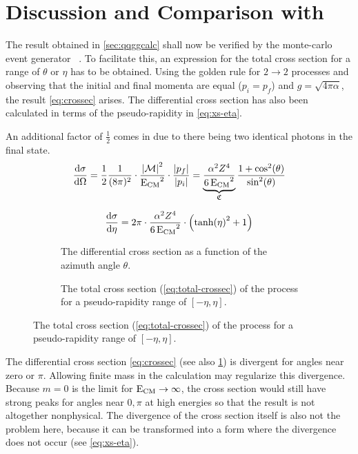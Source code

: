 \section{Discussion and Comparison with \sherpa}%
\label{sec:compsher}

The result obtained in \cref{sec:qqggcalc} shall now be verified by the
monte-carlo event generator \sherpa{}~\cite{Gleisberg:2008ta}. To
facilitate this, an expression for the total cross section for a range
of \(\theta\) or \(\eta\) has to be obtained. Using the golden rule
for \(2\rightarrow 2\) processes and observing that the initial and
final momenta are equal (\(p_i=p_f\)) and \(g=\sqrt{4\pi\alpha}\), the
result \cref{eq:crossec} arises. The differential cross section has
also been calculated in terms of the pseudo-rapidity
in \cref{eq:xs-eta}.

An additional factor of \(\frac{1}{2}\) comes in due to there being
two identical photons in the final state.
\begin{equation}
  \label{eq:crossec}
  \dv{\sigma}{\Omega} =
  \frac{1}{2}\frac{1}{(8\pi)^2}\cdot\frac{\abs{\mathcal{M}}^2}{\operatorname{E_{\text{CM}}}^2}\cdot\frac{\abs{p_f}}{\abs{p_i}}
  = \underbrace{\frac{\alpha^2Z^4}{6\operatorname{E_{\text{CM}}}^2}}_{\mathfrak{C}}\frac{1+\cos^2(\theta)}{\sin^2(\theta)}
\end{equation}

\begin{equation}
  \label{eq:xs-eta}
  \dv{\sigma}{\eta} = 2\pi\cdot\frac{\alpha^2Z^4}{6\operatorname{E_{\text{CM}}}^2}\cdot\qty(\tanh(\eta)^2 + 1)
\end{equation}

\begin{figure}[ht]
  \centering
  \begin{subfigure}[c]{.45\textwidth}
    \centering {}
    \caption[Plot of the differential cross section of the \(\qqgg\)
    process.]{\label{fig:diffxs} The differential cross section as a
      function of the azimuth angle \(\theta\). }
  \end{subfigure}
  \begin{subfigure}[c]{.45\textwidth}
  \centering
  \caption[Plot of the total cross section of the \(\qqgg\)
  process.]{\label{fig:totxs} The total cross section
    (\cref{eq:total-crossec}) of the process for a pseudo-rapidity
    range of \([-\eta, \eta]\).}
  \end{subfigure}
\end{figure}

The differential cross section \cref{eq:crossec} (see
also \cref{fig:diffxs}) is divergent for angles near zero or
\(\pi\). Allowing finite mass in the calculation may regularize this
divergence. Because \(m=0\) is the limit for
\(\operatorname{E_{\text{CM}}}\rightarrow\infty\), the cross section would still have strong
peaks for angles near \(0,\pi\) at high energies so that the result is
not altogether nonphysical. The divergence of the cross section itself
is also not the problem here, because it can be transformed into a
form where the divergence does not occur (see \cref{eq:xs-eta}).

